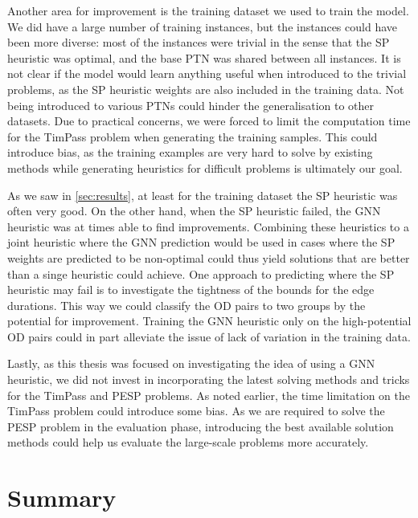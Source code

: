 \documentclass[english, 12pt, a4paper, sci, utf8, a-2b, online]{aaltothesis}
\begin{document}
Another area for improvement is the training dataset we used to train the model. We did have a large number of training instances, but the instances could have been more diverse: most of the instances were trivial in the sense that the SP heuristic was optimal, and the base PTN was shared between all instances. It is not clear if the model would learn anything useful when introduced to the trivial problems, as the SP heuristic weights are also included in the training data. Not being introduced to various PTNs could hinder the generalisation to other datasets. Due to practical concerns, we were forced to limit the computation time for the TimPass problem when generating the training samples. This could introduce bias, as the training examples are very hard to solve by existing methods while generating heuristics for difficult problems is ultimately our goal.

As we saw in \cref{sec:results}, at least for the training dataset the SP heuristic was often very good. On the other hand, when the SP heuristic failed, the GNN heuristic was at times able to find improvements. Combining these heuristics to a joint heuristic where the GNN prediction would be used in cases where the SP weights are predicted to be non-optimal could thus yield solutions that are better than a singe heuristic could achieve. One approach to predicting where the SP heuristic may fail is to investigate the tightness of the bounds for the edge durations. This way we could classify the OD pairs to two groups by the potential for improvement. Training the GNN heuristic only on the high-potential OD pairs could in part alleviate the issue of lack of variation in the training data.

Lastly, as this thesis was focused on investigating the idea of using a GNN heuristic, we did not invest in incorporating the latest solving methods and tricks for the TimPass and PESP problems. As noted earlier, the time limitation on the TimPass problem could introduce some bias. As we are required to solve the PESP problem in the evaluation phase, introducing the best available solution methods could help us evaluate the large-scale problems more accurately.



\clearpage
\section{Summary}
\label{sec:summary}

\

\clearpage
\thesisbibliography
\end{document}
